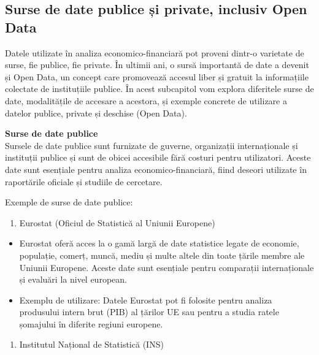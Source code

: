 \documentclass[
  11pt,
  b5paper,
  nottoc]{book}
\providecommand{\tightlist}{%
  \setlength{\itemsep}{0pt}\setlength{\parskip}{0pt}}\usepackage{longtable,booktabs,array}
\begin{document}
\subsection{Surse de date publice și private, inclusiv Open
Data}\label{surse-de-date-publice-ux219i-private-inclusiv-open-data}

Datele utilizate în analiza economico-financiară pot proveni dintr-o
varietate de surse, fie publice, fie private. În ultimii ani, o sursă
importantă de date a devenit și Open Data, un concept care promovează
accesul liber și gratuit la informațiile colectate de instituțiile
publice. În acest subcapitol vom explora diferitele surse de date,
modalitățile de accesare a acestora, și exemple concrete de utilizare a
datelor publice, private și deschise (Open Data).

\textbf{Surse de date publice}\\
Sursele de date publice sunt furnizate de guverne, organizații
internaționale și instituții publice și sunt de obicei accesibile fără
costuri pentru utilizatori. Aceste date sunt esențiale pentru analiza
economico-financiară, fiind deseori utilizate în raportările oficiale și
studiile de cercetare.

Exemple de surse de date publice:

\begin{enumerate}
\def\labelenumi{\arabic{enumi}.}
\tightlist
\item
  Eurostat (Oficiul de Statistică al Uniunii Europene)\\
\end{enumerate}

\begin{itemize}
\tightlist
\item
  Eurostat oferă acces la o gamă largă de date statistice legate de
  economie, populație, comerț, muncă, mediu și multe altele din toate
  țările membre ale Uniunii Europene. Aceste date sunt esențiale pentru
  comparații internaționale și evaluări la nivel european.\\
\item
  Exemplu de utilizare: Datele Eurostat pot fi folosite pentru analiza
  produsului intern brut (PIB) al țărilor UE sau pentru a studia ratele
  șomajului în diferite regiuni europene.
\end{itemize}

\begin{enumerate}
\def\labelenumi{\arabic{enumi}.}
\setcounter{enumi}{1}
\tightlist
\item
  Institutul Național de Statistică (INS)\\
\end{enumerate}
\end{document}
